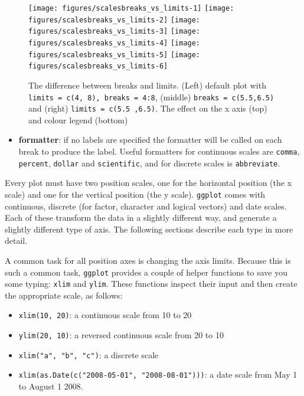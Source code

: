 \begin{figure}
\texttt{[image: figures/scalesbreaks\_vs\_limits-1]} \texttt{[image: figures/scalesbreaks\_vs\_limits-2]} \texttt{[image: figures/scalesbreaks\_vs\_limits-3]} \texttt{[image: figures/scalesbreaks\_vs\_limits-4]} \texttt{[image: figures/scalesbreaks\_vs\_limits-5]} \texttt{[image: figures/scalesbreaks\_vs\_limits-6]} \caption{The difference between breaks and limits. (Left) default plot with \texttt{limits = c(4, 8), breaks = 4:8}, (middle) \texttt{breaks = c(5.5,6.5)} and (right) \texttt{limits = c(5.5 ,6.5)}. The effect on the x axis (top) and colour legend (bottom)\label{fig:breaks_vs_limits}}
\end{figure}

\begin{itemize}
\itemsep1pt\parskip0pt
\item
  \textbf{formatter}: if no labels are specified the formatter will be
  called on each break to produce the label. Useful formatters for
  continuous scales are \texttt{comma}, \texttt{percent},
  \texttt{dollar} and \texttt{scientific}, and for discrete scales is
  \texttt{abbreviate}. 
\end{itemize}


Every plot must have two position scales, one for the horizontal
position (the x scale) and one for the vertical position (the y scale).
\texttt{ggplot} comes with continuous, discrete (for factor, character
and logical vectors) and date scales. Each of these transform the data
in a slightly different way, and generate a slightly different type of
axis. The following sections describe each type in more detail.
 

A common task for all position axes is changing the axis limits. Because
this is such a common task, \texttt{ggplot} provides a couple of helper
functions to save you some typing: \texttt{xlim} and \texttt{ylim}.
These functions inspect their input and then create the appropriate
scale, as follows:  
  

\begin{itemize}
\itemsep1pt\parskip0pt
\item
  \texttt{xlim(10, 20)}: a continuous scale from 10 to 20
\item
  \texttt{ylim(20, 10)}: a reversed continuous scale from 20 to 10
\item
  \texttt{xlim("a", "b", "c")}: a discrete scale
\item
  \texttt{xlim(as.Date(c("2008-05-01", "2008-08-01")))}: a date scale
  from May 1 to August 1 2008.
\end{itemize}

